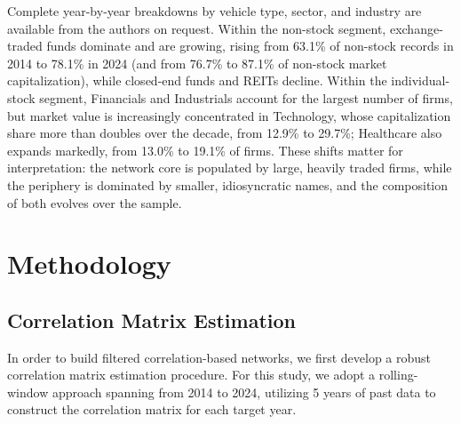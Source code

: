\documentclass[fleqn]{rbfin}
\begin{document}
\begin{table}[!htbp]
    \vspace{1em} %
    
    \caption{Annual global distribution of asset classes. This table presents the relative percentage of non-stock entities (including Exchange-Traded Funds, Closed-End Funds, and Real Estate Investment Trusts) compared to individual stocks from 2014 to 2024. The progression highlights a continuous, decade-long structural shift toward non-stock investment vehicles within the dataset by quantity. Market-capitalization shares are reported for completeness; records with missing or unreported capitalization fields are excluded from the capitalization-based aggregates and therefore do not affect the proportions shown.}
    \label{tab:global_distribution}
\end{table}

\noindent Complete year-by-year breakdowns by vehicle type, sector, and industry are available from the authors on request. Within the non-stock segment, exchange-traded funds dominate and are growing, rising from 63.1\% of non-stock records in 2014 to 78.1\% in 2024 (and from 76.7\% to 87.1\% of non-stock market capitalization), while closed-end funds and REITs decline. Within the individual-stock segment, Financials and Industrials account for the largest number of firms, but market value is increasingly concentrated in Technology, whose capitalization share more than doubles over the decade, from 12.9\% to 29.7\%; Healthcare also expands markedly, from 13.0\% to 19.1\% of firms. These shifts matter for interpretation: the network core is populated by large, heavily traded firms, while the periphery is dominated by smaller, idiosyncratic names, and the composition of both evolves over the sample.

\section{Methodology}\label{sec:methodology}

\subsection{Correlation Matrix Estimation}

\noindent In order to build filtered correlation-based networks, we first develop a robust correlation matrix estimation procedure. For this study, we adopt a rolling-window approach spanning from 2014 to 2024, utilizing 5 years of past data to construct the correlation matrix for each target year.
\end{document}
